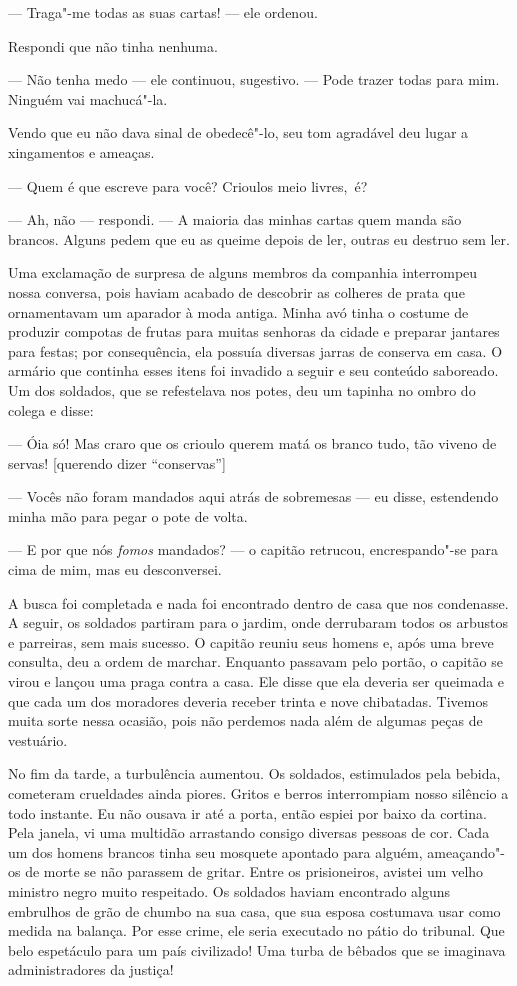 --- Traga"-me todas as suas cartas! --- ele ordenou.

Respondi que não tinha nenhuma.

--- Não tenha medo --- ele continuou, sugestivo. --- Pode trazer todas
para mim. Ninguém vai machucá"-la.

Vendo que eu não dava sinal de obedecê"-lo, seu tom agradável deu lugar a
xingamentos e ameaças.

--- Quem é que escreve para você? Crioulos meio livres,~é?

--- Ah, não --- respondi. --- A maioria das minhas cartas quem manda são
brancos. Alguns pedem que eu as queime depois de ler, outras eu destruo
sem ler.

Uma exclamação de surpresa de alguns
membros da companhia interrompeu nossa conversa, pois haviam acabado de
descobrir as colheres de prata que ornamentavam um aparador à moda
antiga. Minha avó tinha o costume de produzir compotas de frutas para
muitas senhoras da cidade e preparar jantares para festas; por
consequência, ela possuía diversas jarras de conserva em casa. O armário
que continha esses itens foi invadido a seguir e seu conteúdo saboreado.
Um dos soldados, que se refestelava nos potes, deu um tapinha no ombro
do colega e disse:

--- Óia só! Mas craro que os crioulo querem matá os branco tudo, tão
viveno de servas! {[}querendo dizer ``conservas''{]}

--- Vocês não foram mandados aqui atrás de sobremesas --- eu disse,
estendendo minha mão para pegar o pote de volta.

--- E por que nós \emph{fomos}
mandados? --- o capitão retrucou, encrespando"-se para cima de mim, mas
eu desconversei.

A busca foi completada e nada foi
encontrado dentro de casa que nos condenasse. A seguir, os soldados
partiram para o jardim, onde derrubaram todos os arbustos e parreiras,
sem mais sucesso. O capitão reuniu seus homens e, após uma breve
consulta, deu a ordem de marchar. Enquanto passavam pelo portão, o
capitão se virou e lançou uma praga contra a casa. Ele disse que ela
deveria ser queimada e que cada um dos moradores deveria receber trinta
e nove chibatadas. Tivemos muita sorte nessa ocasião, pois não perdemos
nada além de algumas peças de vestuário.

No fim da tarde, a turbulência
aumentou. Os soldados, estimulados pela bebida, cometeram crueldades
ainda piores. Gritos e berros interrompiam nosso silêncio a todo
instante. Eu não ousava ir até a porta, então espiei por baixo da
cortina. Pela janela, vi uma multidão arrastando consigo diversas
pessoas de cor. Cada um dos homens brancos tinha seu mosquete apontado
para alguém, ameaçando"-os de morte se não parassem de gritar. Entre os
prisioneiros, avistei um velho ministro negro muito respeitado. Os
soldados haviam encontrado alguns embrulhos de grão de chumbo na sua
casa, que sua esposa costumava usar como medida na balança. Por esse
crime, ele seria executado no pátio do tribunal. Que belo espetáculo
para um país civilizado! Uma turba de bêbados que se imaginava
administradores da justiça!

